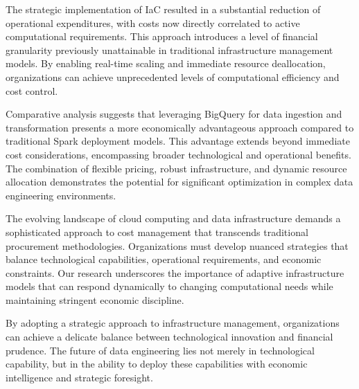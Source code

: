 The strategic implementation of IaC resulted in a substantial reduction of operational expenditures,
with costs now directly correlated to active computational requirements. This approach introduces a
level of financial granularity previously unattainable in traditional infrastructure management
models. By enabling real-time scaling and immediate resource deallocation, organizations can achieve
unprecedented levels of computational efficiency and cost control.

Comparative analysis suggests that leveraging BigQuery for data ingestion and transformation
presents a more economically advantageous approach compared to traditional Spark deployment models.
This advantage extends beyond immediate cost considerations, encompassing broader technological and
operational benefits. The combination of flexible pricing, robust infrastructure, and dynamic
resource allocation demonstrates the potential for significant optimization in complex data
engineering environments.

The evolving landscape of cloud computing and data infrastructure demands a sophisticated approach
to cost management that transcends traditional procurement methodologies. Organizations must develop
nuanced strategies that balance technological capabilities, operational requirements, and economic
constraints. Our research underscores the importance of adaptive infrastructure models that can
respond dynamically to changing computational needs while maintaining stringent economic discipline.

By adopting a strategic approach to infrastructure management, organizations can achieve a delicate
balance between technological innovation and financial prudence. The future of data engineering lies
not merely in technological capability, but in the ability to deploy these capabilities with
economic intelligence and strategic foresight.

